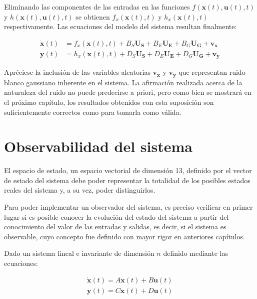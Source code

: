 Eliminando las componentes de las entradas en las funciones $f(\boldsymbol{x}(t),\boldsymbol{u}(t),t)$ y $h(\boldsymbol{x}(t),\boldsymbol{u}(t),t)$ se obtienen $f_x(\boldsymbol{x}(t),t)$ y $h_x(\boldsymbol{x}(t),t)$ respectivamente. Las ecuaciones del modelo del sistema resultan finalmente:

\begin{equation}
\begin{split}
	\boldsymbol{\dot{x}}(t) &= f_x(\boldsymbol{x}(t),t) + B_S\boldsymbol{U_S} + B_E\boldsymbol{U_E} + B_G\boldsymbol{U_G} + \boldsymbol{v_x} \\
	\boldsymbol{y}(t) &= h_x(\boldsymbol{x}(t),t) + D_S\boldsymbol{U_S} + D_E\boldsymbol{U_E} + D_G\boldsymbol{U_G} + \boldsymbol{v_y}
	\label{eq:ecmodelo}
\end{split}
\end{equation}

Apréciese la inclusión de las variables aleatorias $\boldsymbol{v_x}$ y $\boldsymbol{v_y}$ que representan ruido blanco gaussiano inherente en el sistema. La afirmación realizada acerca de la naturaleza del ruido no puede predecirse a priori, pero como bien se mostrará en el próximo capítulo, los resultados obtenidos con esta suposición son suficientemente correctos como para tomarla como válida.

\section{Observabilidad del sistema}

El espacio de estado, un espacio vectorial de dimensión 13, definido por el vector de estado del sistema debe poder representar la totalidad de los posibles estados reales del sistema y, a su vez, poder distinguirlos.

Para poder implementar un observador del sistema, es preciso verificar en primer lugar si es posible conocer la evolución del estado del sistema a partir del conocimiento del valor de las entradas y salidas, es decir, si el sistema es observable, cuyo concepto fue definido con mayor rigor en anteriores capítulos. \par 

\noindent
Dado un sistema lineal e invariante de dimensión $n$ definido mediante las ecuaciones:

\begin{equation}
\begin{split}
	\boldsymbol{\dot{x}}(t) = A \boldsymbol{x}(t) + B \boldsymbol{u}(t) \\
	\boldsymbol{y}(t) = C \boldsymbol{x}(t) + D \boldsymbol{u}(t)
\end{split}
\label{eq:sistlineal}
\end{equation}

